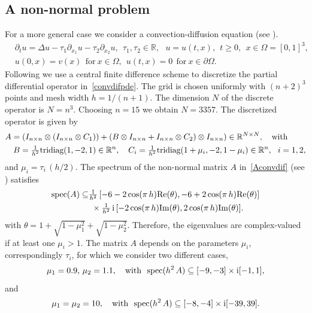 \documentclass[smallextended]{svjour3pre}%
\numberwithin{equation}{section}
\numberwithin{figure}{section}
\numberwithin{table}{section}
\newcommand{\R}{\mathbb R}
\newcommand\tjnew[1]{{#1}}
\newcommand{\ii}{{\rm i}}
\begin{document}
\tjnew{\subsection{A non-normal problem}\label{sec:numgen}
For a more general case we consider a convection-diffusion equation (see \cite{MN01,EE06}).
\begin{equation}\label{convdifpde}
\begin{aligned}
&\partial_t u = \Delta u - \tau_1 \partial_{x_1} u - \tau_2 \partial_{x_2} u,~~\tau_1,\tau_2\in\R,~~~u=u(t,x),~~t\geq 0,~~ x\in\Omega=[0,1]^3,\\
&u(0,x)=v(x)~~\text{for}~x\in\Omega,~~u(t,x)=0~~\text{for}~x\in\partial\Omega.
\end{aligned}
\end{equation}
Following \cite{MN01,EE06} we use a central finite difference scheme to discretize the partial differential operator in~\eqref{convdifpde}.
The grid is chosen uniformly with $(n+2)^3$ points and mesh width $h=1/(n+1)$.
The dimension $N$ of the discrete operator is $N=n^3$.
Choosing $n=15$ we obtain $N=3357$.
The discretized operator is given by
\begin{align}
&A=( I_{n\times n} \otimes (I_{n\times n} \otimes C_1) ) 
+ ( B \otimes I_{n\times n} + I_{n\times n}\otimes C_2 ) \otimes I_{n\times n} )\in\R^{N\times N},~~~\text{with}\label{Aconvdif}\\
&~~~B=\tfrac{1}{h^2} \text{tridiag}(1,-2,1)\in\R^n,~~~
C_i=\tfrac{1}{h^2} \text{tridiag}(1+\mu_i,-2,1-\mu_i)\in\R^n,~~i=1,2,\notag
\end{align}
and $\mu_i=\tau_i\,(h/2)$. 
The spectrum of the non-normal matrix $A$ in~\eqref{Aconvdif} (see \cite{MN01}) satisfies
\begin{align*}
\text{spec}(A)\subseteq &\tfrac{1}{h^2}\,[-6-2\cos(\pi\,h)\text{Re}(\theta),-6+2\cos(\pi\,h)\text{Re}(\theta)] \\
   &~\times \tfrac{1}{h^2}\,\ii\,[-2\cos(\pi\,h)\text{Im}(\theta),2\cos(\pi\,h)\text{Im}(\theta)] .
\end{align*}
with $\theta = 1 + \sqrt{1-\mu_1^2} + \sqrt{1-\mu_2^2}$.
Therefore, the eigenvalues are complex-valued if at least one $\mu_i>1$.
The matrix $A$ depends on the parameters $\mu_i$, correspondingly $\tau_i$, for which we consider two different cases,
\begin{equation}\label{cdsetting1}
\text{$\mu_1=0.9$, $\mu_2=1.1$},~~~\text{with}~~\text{spec}(h^2\,A) \subseteq [-9,-3] \times \ii[-1,1],
\end{equation}
and
\begin{equation}\label{cdsetting2}
\text{$\mu_1=\mu_2=10$},~~~\text{with}~~\text{spec}(h^2\,A) \subseteq [-8,-4] \times \ii [ -39,39].
\end{equation}

}
\end{document}
